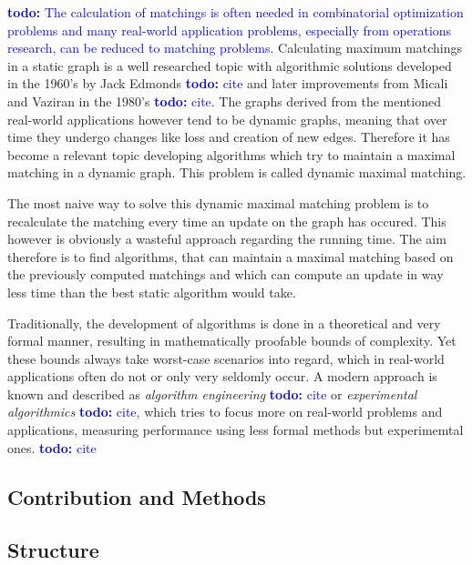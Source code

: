 \documentclass{article}      %
\newcommand\todo[1]{\textcolor{blue}{\textbf{todo: }#1}}
\begin{document}
\todo{The calculation of matchings is often needed in combinatorial optimization problems and many real-world application problems, especially from operations research, can be reduced to matching problems.} Calculating maximum matchings in a static graph is a well researched topic with algorithmic solutions developed in the 1960's by Jack Edmonds \todo{cite} and later improvements from Micali and Vaziran in the 1980's \todo{cite}. The graphs derived from the mentioned real-world applications however tend to be dynamic graphs, meaning that over time they undergo changes like loss and creation of new edges. Therefore it has become a relevant topic developing algorithms which try to maintain a maximal matching in a dynamic graph. This problem is called dynamic maximal matching.

The most naive way to solve this dynamic maximal matching problem is to recalculate the matching every time an update on the graph has occured. This however is obviously a wasteful approach regarding the running time. The aim therefore is to find algorithms, that can maintain a maximal matching based on the previously computed matchings and which can compute an update in way less time than the best static algorithm would take.

Traditionally, the development of algorithms is done in a theoretical and very formal manner, resulting in mathematically proofable bounds of complexity. Yet these bounds always take worst-case scenarios into regard, which in real-world applications often do not or only very seldomly occur. A modern approach is known and described as \emph{algorithm engineering} \todo{cite} or \emph{experimental algorithmics} \todo{cite}, which tries to focus more on real-world problems and applications, measuring performance using less formal methods but experimemtal ones. \todo{cite}

\subsection{Contribution and Methods}
\label{sec:cont-meth}


\subsection{Structure}
\label{sec:struct}
\end{document}
